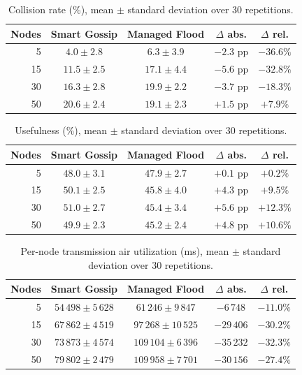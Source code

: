 \documentclass[english,bachelor]{tfgitic}[2026/01/22]
\begin{document}
\begin{table}[htbp]
    \centering
    \caption{Collision rate (\%), mean $\pm$ standard deviation over 30 repetitions.}
    \label{tab:res_col}
    \begin{tabular}{rcccc}
        \toprule
        Nodes & Smart Gossip & Managed Flood & $\Delta$ abs. & $\Delta$ rel. \\
        \midrule
        5  & $4.0 \pm 2.8$  & $6.3 \pm 3.9$  & $-2.3$ pp & $-36.6\%$ \\
        15 & $11.5 \pm 2.5$ & $17.1 \pm 4.4$ & $-5.6$ pp & $-32.8\%$ \\
        30 & $16.3 \pm 2.8$ & $19.9 \pm 2.2$ & $-3.7$ pp & $-18.3\%$ \\
        50 & $20.6 \pm 2.4$ & $19.1 \pm 2.3$ & $+1.5$ pp & $+7.9\%$ \\
        \bottomrule
    \end{tabular}
\end{table}
 
\begin{table}[htbp]
    \centering
    \caption{Usefulness (\%), mean $\pm$ standard deviation over 30 repetitions.}
    \label{tab:res_useful}
    \begin{tabular}{rcccc}
        \toprule
        Nodes & Smart Gossip & Managed Flood & $\Delta$ abs. & $\Delta$ rel. \\
        \midrule
        5  & $48.0 \pm 3.1$ & $47.9 \pm 2.7$ & $+0.1$ pp & $+0.2\%$ \\
        15 & $50.1 \pm 2.5$ & $45.8 \pm 4.0$ & $+4.3$ pp & $+9.5\%$ \\
        30 & $51.0 \pm 2.7$ & $45.4 \pm 3.4$ & $+5.6$ pp & $+12.3\%$ \\
        50 & $49.9 \pm 2.3$ & $45.2 \pm 2.4$ & $+4.8$ pp & $+10.6\%$ \\
        \bottomrule
    \end{tabular}
\end{table}
 
\begin{table}[htbp]
    \centering
    \caption{Per-node transmission air utilization (ms), mean $\pm$ standard deviation over 30 repetitions.}
    \label{tab:res_txair}
    \begin{tabular}{rcccc}
        \toprule
        Nodes & Smart Gossip & Managed Flood & $\Delta$ abs. & $\Delta$ rel. \\
        \midrule
        5  & $54\,498 \pm 5\,628$ & $61\,246 \pm 9\,847$  & $-6\,748$  & $-11.0\%$ \\
        15 & $67\,862 \pm 4\,519$ & $97\,268 \pm 10\,525$ & $-29\,406$ & $-30.2\%$ \\
        30 & $73\,873 \pm 4\,574$ & $109\,104 \pm 6\,396$ & $-35\,232$ & $-32.3\%$ \\
        50 & $79\,802 \pm 2\,479$ & $109\,958 \pm 7\,701$ & $-30\,156$ & $-27.4\%$ \\
        \bottomrule
    \end{tabular}
\end{table}
 
\end{document}
